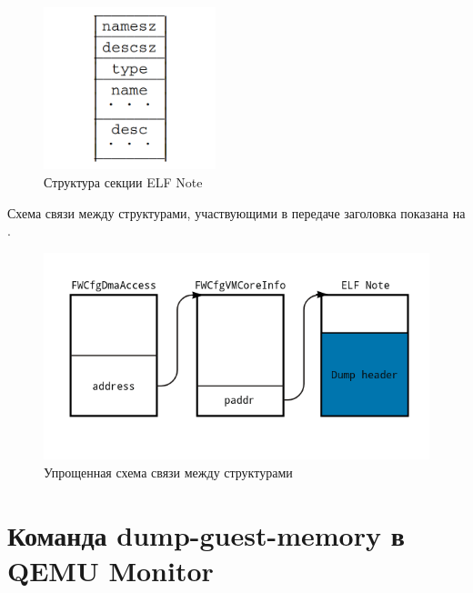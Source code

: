 \documentclass{mipt-thesis-bs}
\begin{document}
\begin{figure}[h]
\begin{center}
    \includegraphics[width=5cm]{note.png}
    \caption{Структура секции ELF Note}
    \label{fig:elfnote}
\end{center}
\end{figure}

Схема связи между структурами, участвующими в передаче заголовка показана на .

\begin{figure}[h]
\begin{center}
    \includegraphics[width=1\textwidth]{vmci_scheme1.png}
    \caption{Упрощенная схема связи между структурами}
    \label{fig:sc1}
\end{center}
\end{figure}

\newpage
\section*{Команда dump-guest-memory в QEMU Monitor}
\end{document}
